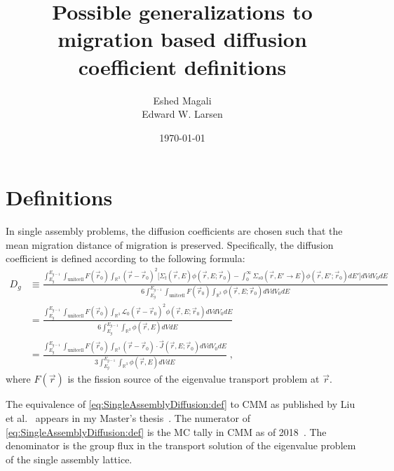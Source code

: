 \documentclass[a4paper,letterpaper,12pt,oneside,draft]{article}
\title{Possible generalizations to migration based diffusion coefficient definitions}
\author{Eshed Magali \\ Edward W. Larsen}
\date{\today}
\newcommand{\eec}{\;,}
\newcommand{\OpL}{\mathscr{L}}
\newcommand{\allspace}{\ensuremath{\mathbb{R}^3}}
\newcommand{\intg}[2][g]{\ensuremath{\int_{E_{#1}}^{E_{#1-1}} #2 dE}}
\newcommand{\vr}{\ensuremath{\vec{r}}}
\newcommand{\dvr}{\left(\vr-\vr_0\right)}
\begin{document}
\maketitle
\section{Definitions}
In single assembly problems, the diffusion coefficients are chosen such that the mean migration distance of migration is preserved. 
Specifically, the diffusion coefficient is defined according to the following formula:
\begin{align}
    \nonumber
    D_g &\equiv \frac{\intg{\int_{\text{unitcell}} F(\vr_0)\int_{\allspace}\dvr^2 \Bigg[ \Sigma_t(\vr,E)\phi(\vr,E;\vr_0) - \int_0^\infty \Sigma_{s0}(\vr,E'\to E) \phi(\vr,E';\vr_0) dE'\Bigg]dVdV_0}} {6\intg{\int_{\text{unitcell}}F(\vr_0)\int_{\allspace} \phi(\vr,E;\vr_0)dVdV_0}} \\ \nonumber
    &= \frac{\intg{\int_{\text{unitcell}} F(\vr_0)\int_{\allspace}\OpL_0 \dvr^2 \phi(\vr,E;\vr_0) dVdV_0}} {6\intg{\int_{\allspace} \phi(\vr,E)dV}} \\
    \label{eq:SingleAssemblyDiffusion:def}
    &= \frac{\intg{\int_{\text{unitcell}} F(\vr_0)\int_{\allspace}\dvr\cdot\vec{J}(\vr,E;\vr_0) dVdV_0}} {3\intg{\int_{\allspace} \phi(\vr,E)dV}}\eec
\end{align}
where $F(\vr)$ is the fission source of the eigenvalue transport problem at $\vr$.

The equivalence of \cref{eq:SingleAssemblyDiffusion:def} to CMM as published by Liu et al.~\cite{Liu2018} appears in my Master's thesis~\cite{EshedThesis}. 
The numerator of \cref{eq:SingleAssemblyDiffusion:def} is the MC tally in CMM as of 2018~\cite{Liu2018}. 
The denominator is the group flux in the transport solution of the eigenvalue problem of the single assembly lattice.
\end{document}
